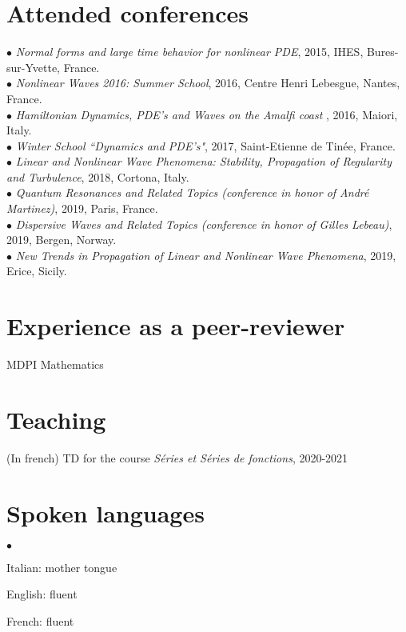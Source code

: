 \documentclass[margin,line,pifont,palatino,courier]{res}
\newenvironment{list2}{
  \begin{list}{$\bullet$}{%
      \setlength{\itemsep}{0in}
      \setlength{\parsep}{0in} \setlength{\parskip}{0in}
      \setlength{\topsep}{0in} \setlength{\partopsep}{0in}
      \setlength{\leftmargin}{0.2in}}}{\end{list}}
\begin{document}
\begin{resume}
\section{\sc Attended conferences \\}
 $\bullet$ \emph{Normal forms and large time behavior for nonlinear PDE}, 2015, IHES, Bures-sur-Yvette, France.  \\
 $\bullet$  \emph{Nonlinear Waves 2016: Summer School}, 2016, Centre Henri Lebesgue, Nantes, France.  \\
$\bullet$ \emph{Hamiltonian Dynamics, PDE's and Waves on the Amalfi coast
}, 2016, Maiori, Italy. \\
$\bullet$ \emph{Winter School ``Dynamics and PDE's"}, 2017, Saint-Etienne de Tin\'ee, France. \\
$\bullet$ \emph{Linear and Nonlinear Wave Phenomena: Stability, Propagation of Regularity and Turbulence}, 2018, Cortona, Italy.\\
$\bullet$ \emph{Quantum Resonances and Related Topics (conference in honor of Andr\'e Martinez)}, 2019, Paris, France. \\
$\bullet$ \emph{Dispersive Waves and Related Topics (conference in honor of Gilles Lebeau)}, 2019, Bergen, Norway.\\
$\bullet$ \emph{New Trends in Propagation of Linear and Nonlinear Wave Phenomena}, 2019, Erice, Sicily. \\

\section{\sc Experience as a peer-reviewer} MDPI Mathematics

\section{\sc Teaching} (In french) TD for the course \emph{S\'eries et S\'eries de fonctions}, 2020-2021

\section{\sc Spoken languages} \begin{list2}
\vspace*{.05in}
\item  Italian: mother tongue
\item English: fluent
\item French: fluent
\end{list2}




\end{resume}
\end{document}
